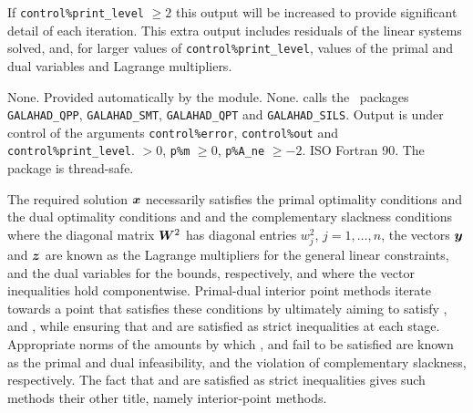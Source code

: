 \documentclass{galahad}
\newcommand{\packagename}{CLS}
\begin{document}
If {\tt control\%print\_level} $\geq 2$ this 
output will be increased to provide significant detail of each iteration. 
This extra output includes residuals of the linear systems solved, and,
for larger values of {\tt control\%print\_level}, values of the primal and dual
variables and Lagrange multipliers. 


\galgeneral

\galcommon None.
\galworkspace Provided automatically by the module.
\galroutines None. 
\galmodules {\tt \packagename\_solve} calls the \galahad\ packages
{\tt GALAHAD\_QPP}, 
{\tt GALAHAD\_SMT}, \sloppy
{\tt GALAHAD\_QPT} and 
{\tt GALAHAD\_SILS}.
\galio Output is under control of the arguments
 {\tt control\%error}, {\tt control\%out} and {\tt control\%print\_level}.
 $> 0$, 
{\tt p\%m} $\geq  0$, {\tt p\%A\_ne} $\geq -2$.
\galportability ISO Fortran 90. The package is thread-safe.


\galmethod
The required solution ${\bm{x}}$ necessarily satisfies 
the primal optimality conditions
and 
the dual optimality conditions
and 
and the complementary slackness conditions 
where the diagonal matrix ${\bm{W}}^{2}$ has diagonal entries $w_{j}^{2}$,
$j = 1, \ldots ,n$, the vectors ${\bm{y}}$ and ${\bm{z}}$ are 
known as the Lagrange multipliers for
the general linear constraints, and the dual variables for the bounds,
respectively, and where the vector inequalities hold componentwise.
Primal-dual interior point methods iterate towards a point
that satisfies these conditions by ultimately aiming to satisfy
,  and , while ensuring that 
 and  are 
satisfied as strict inequalities at each stage. 
Appropriate norms of the amounts by 
which ,  and  fail to be satisfied are known as the
primal and dual infeasibility, and the violation of complementary slackness,
respectively. The fact that  and  are satisfied as strict 
inequalities gives such methods their other title, namely 
interior-point methods.
\end{document}
